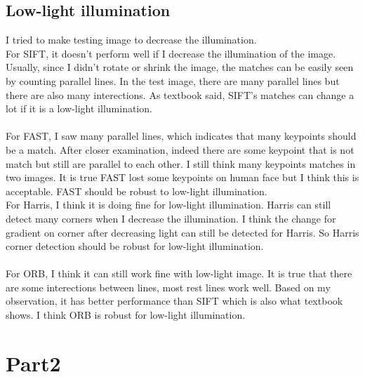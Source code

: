 \documentclass{article}
\begin{document}
\subsection*{Low-light illumination}
I tried to make testing image to decrease the illumination.\\
For SIFT, it doesn't perform well if I decrease the illumination of the image.
Usually, since I didn't rotate or shrink the image, the matches can be easily seen by counting parallel lines.
In the test image, there are many parallel lines but there are also many interections.
As textbook said, SIFT's matches can change a lot if it is a low-light illumination.\\
\\
For FAST, I saw many parallel lines, which indicates that many keypoints should be a match.
After closer examination, indeed there are some keypoint that is not match but still are parallel to each other.
I still think many keypoints matches in two images.
It is true FAST lost some keypoints on human face but I think this is acceptable.
FAST should be robust to low-light illumination.
\\
For Harris, I think it is doing fine for low-light illumination.
Harris can still detect many corners when I decrease the illumination.
I think the change for gradient on corner after decreasing light can still be detected for Harris.
So Harris corner detection should be robust for low-light illumination.\\
\\
For ORB, I think it can still work fine with low-light image.
It is true that there are some interections between lines, most rest lines work well.
Based on my observation, it has better performance than SIFT which is also what textbook shows.
I think ORB is robust for low-light illumination.
\section*{Part2}
\end{document}
